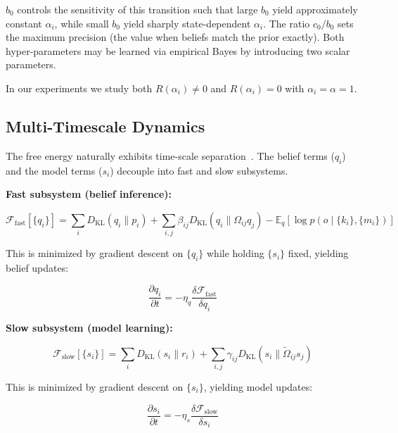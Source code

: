 \documentclass[twoside,11pt]{article}
\begin{document}
$b_0$ controls the sensitivity of this transition such that large $b_0$ yield approximately constant $\alpha_i$, while small $b_0$ yield sharply state-dependent $\alpha_i$. The ratio $c_0/b_0$ sets the maximum precision (the value when beliefs match the prior exactly). Both hyper-parameters may be learned via empirical Bayes by introducing two scalar parameters.

In our experiments we study both $R(\alpha_i) \neq 0$ and $R(\alpha_i) = 0$ with $\alpha_i = \alpha = 1$.


\subsection{Multi-Timescale Dynamics}

The free energy naturally exhibits time-scale separation~\citep{boettcher2012renormalization}. The belief terms ($q_i$) and the model terms ($s_i$) decouple into fast and slow subsystems.

\textbf{Fast subsystem (belief inference):}

\begin{equation}
\mathcal{F}_{\text{fast}}[\{q_i\}] =
\sum_i D_{\mathrm{KL}}(q_i \| p_i)
+ \sum_{i,j} \beta_{ij} D_{\mathrm{KL}}(q_i \| \Omega_{ij} q_j)
- \mathbb{E}_q[\log p(o \mid \{k_i\}, \{m_i\})]
\label{eq:fast_subsystem}
\end{equation}

This is minimized by gradient descent on $\{q_i\}$ while holding $\{s_i\}$ fixed, yielding belief updates:

\begin{equation}
\frac{\partial q_i}{\partial t} = -\eta_q \frac{\delta \mathcal{F}_{\text{fast}}}{\delta q_i}
\label{eq:belief_dynamics}
\end{equation}


\textbf{Slow subsystem (model learning):}

\begin{equation}
\mathcal{F}_{\text{slow}}[\{s_i\}] =
\sum_i D_{\mathrm{KL}}(s_i \| r_i)
+ \sum_{i,j} \gamma_{ij} D_{\mathrm{KL}}(s_i \| \tilde{\Omega}_{ij} s_j)
\label{eq:slow_subsystem}
\end{equation}

This is minimized by gradient descent on $\{s_i\}$, yielding model updates:

\begin{equation}
\frac{\partial s_i}{\partial t} = -\eta_s \frac{\delta \mathcal{F}_{\text{slow}}}{\delta s_i}
\label{eq:model_dynamics}
\end{equation}
\end{document}
